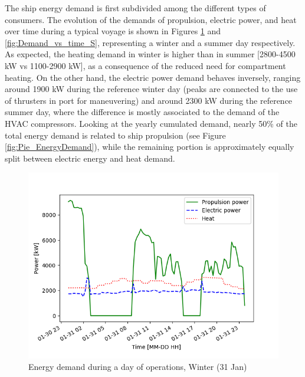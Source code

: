 \documentclass[preprint,12pt]{elsarticle}
\begin{document}
The ship energy demand is first subdivided among the different types of consumers. The evolution of the demands of propulsion, electric power, and heat over time during a typical voyage is shown in Figures \ref{fig:Demand_vs_time_W} and \ref{fig:Demand_vs_time_S}, representing a winter and a summer day respectively. As expected, the heating demand in winter is higher than in summer [2800-4500 kW vs 1100-2900 kW], as a consequence of the reduced need for compartment heating. On the other hand, the electric power demand behaves inversely, ranging around 1900 kW during the reference winter day (peaks are connected to the use of thrusters in port for maneuvering) and around 2300 kW during the reference summer day, where the difference is mostly associated to the demand of the HVAC compressors. Looking at the yearly cumulated demand, nearly 50\% of the total energy demand is related to ship propulsion (see Figure \ref{fig:Pie_EnergyDemand}), while the remaining portion is approximately equally split between electric energy and heat demand.



\begin{figure}[htbp]
	\centering
	\includegraphics[width=0.9\linewidth]{Figures/Demand_vs_time_W}
	\caption{Energy demand during a day of operations, Winter (31 Jan)}
	\label{fig:Demand_vs_time_W}
\end{figure}
\end{document}

